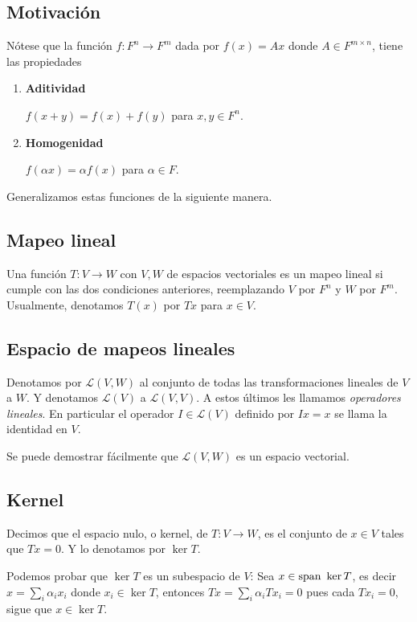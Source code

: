 \documentclass{article}
\begin{document}
\subsection{Motivación}
Nótese que la función $f: F^n \rightarrow F^m$ dada por
$f(x) = Ax$ donde $A\in F^{m\times n}$, tiene las propiedades
\begin{enumerate}
    \item \textbf{Aditividad}

    $f(x+y) = f(x) + f(y)$ para $x,y\in F^n$.

    \item \textbf{Homogenidad}

    $f(\alpha x) = \alpha f(x)$ para $\alpha\in F$.
\end{enumerate}
Generalizamos estas funciones de la siguiente manera.

\subsection{Mapeo lineal}
Una función $T: V\rightarrow W$ con $V,W$ de espacios vectoriales es
un mapeo lineal si cumple con las dos condiciones anteriores, reemplazando $V$ por $F^n$ y $W$ por $F^m$. Usualmente,
denotamos $T(x)$ por $Tx$ para $x\in V$.

\subsection{Espacio de mapeos lineales}
Denotamos por $\mathcal{L}(V,W)$ al conjunto de todas
las transformaciones lineales de $V$ a $W$.
Y denotamos $\mathcal{L}(V)$ a $\mathcal{L}(V, V)$. A estos últimos
les llamamos \textit{operadores lineales}. En particular el operador
$I\in\mathcal{L}(V)$ definido por $Ix=x$ se llama la identidad en $V$.

Se puede demostrar fácilmente que $\mathcal{L}(V,W)$ es un espacio vectorial.

\subsection{Kernel}
Decimos que el espacio nulo, o kernel, de $T: V \rightarrow W$, es el conjunto de $x\in V$ tales que $Tx=0$. Y lo denotamos por
$\ker T$.

Podemos probar que $\ker T$ es un subespacio de $V$:
Sea $x \in \text{span } \ker T$, es decir $x = \sum_i \alpha_i x_i$ donde
$x_i\in \ker T$, entonces $Tx = \sum_i \alpha_i Tx_i = 0$ pues
cada $Tx_i=0$, sigue que $x\in\ker T$.
\end{document}
